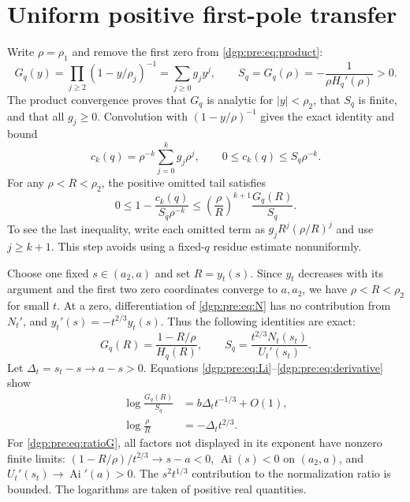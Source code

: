 \documentclass[11pt,letterpaper]{article}
\numberwithin{equation}{section}
\theoremstyle{remark}\newtheorem{remark}[theorem]{Remark}
\newcommand{\Ai}{\operatorname{Ai}}
\begin{document}
\section{Uniform positive first-pole transfer}\label{dgp:pre:sec:pole}
Write $\rho=\rho_1$ and remove the first zero from \eqref{dgp:pre:eq:product}:
\begin{equation}
 G_q(y)=\prod_{j\geq2}(1-y/\rho_j)^{-1}
        =\sum_{j\geq0}g_jy^j,
 \qquad S_q=G_q(\rho)=-\frac1{\rho H_q'(\rho)}>0.
 \label{dgp:pre:eq:G}
\end{equation}
The product convergence proves that $G_q$ is analytic for $|y|<\rho_2$,
that $S_q$ is finite, and that all $g_j\geq0$.
Convolution with $(1-y/\rho)^{-1}$ gives the exact identity and bound
\begin{equation}
 c_k(q)=\rho^{-k}\sum_{j=0}^k g_j\rho^j,
 \qquad 0\leq c_k(q)\leq S_q\rho^{-k}.
 \label{dgp:pre:eq:positive}
\end{equation}
For any $\rho<R<\rho_2$, the positive omitted tail satisfies
\begin{equation}
 0\leq1-\frac{c_k(q)}{S_q\rho^{-k}}
 \leq\left(\frac\rho R\right)^{k+1}\frac{G_q(R)}{S_q}.
 \label{dgp:pre:eq:tailpole}
\end{equation}
To see the last inequality, write each omitted term as
$g_jR^j(\rho/R)^j$ and use $j\geq k+1$.
This step avoids using a fixed-$q$ residue estimate nonuniformly.

Choose one fixed $s\in(a_2,a)$ and set $R=y_t(s)$. Since $y_t$ decreases
with its argument and the first two zero coordinates converge to
$a,a_2$, we have $\rho<R<\rho_2$ for small $t$.
At a zero, differentiation of \eqref{dgp:pre:eq:N} has no contribution from
$N_t'$, and $y_t'(s)=-t^{2/3}y_t(s)$. Thus the following identities are
exact:
\begin{equation}
 G_q(R)=\frac{1-R/\rho}{H_q(R)},\qquad
 S_q=\frac{t^{2/3}N_t(s_t)}{U_t'(s_t)}.
 \label{dgp:pre:eq:exactS}
\end{equation}
Let $\Delta_t=s_t-s\to a-s>0$. Equations
\eqref{dgp:pre:eq:Li}--\eqref{dgp:pre:eq:derivative} show
\begin{align}
 \log\frac{G_q(R)}{S_q}&=b\Delta_t t^{-1/3}+O(1),\label{dgp:pre:eq:ratioG}\\
 \log\frac\rho R&=-\Delta_t t^{2/3}.\label{dgp:pre:eq:rhoratio}
\end{align}
For \eqref{dgp:pre:eq:ratioG}, all factors not displayed in its exponent have
nonzero finite limits: $(1-R/\rho)/t^{2/3}\to s-a<0$,
$\Ai(s)<0$ on $(a_2,a)$, and $U_t'(s_t)\to\Ai'(a)>0$.
The $s^2t^{1/3}$ contribution to the normalization ratio is bounded.
The logarithms are taken of positive real quantities.
\end{document}
